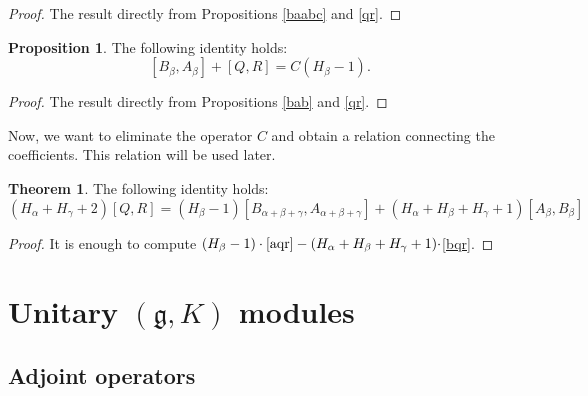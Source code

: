 \documentclass[twoside,a4paper,12pt]{article}
\newcommand{\g}{\ensuremath{\mathfrak g}}
\theoremstyle{definition}
\newtheorem{theorem}{Theorem}
\newtheorem{proposition}{Proposition}
\begin{document}
\begin{proof}
	The result directly from Propositions \ref{baabc} and \ref{qr}.
\end{proof}

\begin{proposition}
	The following identity holds:
	\begin{equation}\label{bqr}
		[B_\beta,A_\beta]+[Q,R]=C(H_\beta-1).
	\end{equation}
\end{proposition}

\begin{proof}
	The result directly from Propositions \ref{bab} and \ref{qr}.
\end{proof}

Now, we want to eliminate the operator $C$ and obtain a relation
connecting the coefficients. This relation will be used later.

\begin{theorem}\label{qrel}
	The following identity holds:
	\begin{equation}\label{qrrel}
		(H_\alpha+H_\gamma+2)[Q,R]=
		(H_\beta-1)[B_{\alpha+\beta+\gamma},A_{\alpha+\beta+\gamma}]
		+(H_\alpha+H_\beta+H_\gamma+1)[A_\beta,B_\beta]
	\end{equation}
\end{theorem}

\begin{proof}
	It is enough to compute
	$(H_\beta-1)\cdot\eqref{aqr}-(H_\alpha+H_\beta+H_\gamma+1)\cdot$\eqref{bqr}.
\end{proof}





\section{\texorpdfstring{Unitary $(\g,K)$ modules}{Unitary (g,K) modules}}

\subsection{Adjoint operators}
\end{document}

